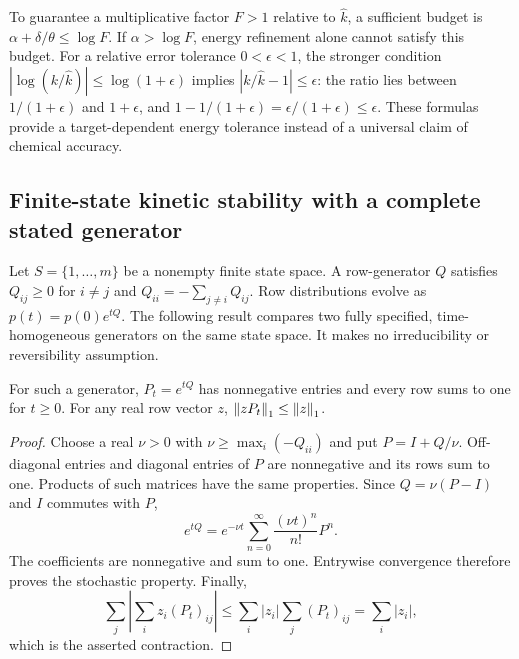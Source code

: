 To guarantee a multiplicative factor $F>1$ relative to $\widehat k$, a
sufficient budget is $\alpha+\delta/\theta\le\log F$.
If $\alpha>\log F$, energy refinement alone cannot satisfy this budget.
For a relative error tolerance $0<\epsilon<1$, the stronger condition
$|\log(k/\widehat k)|\le\log(1+\epsilon)$ implies
$|k/\widehat k-1|\le\epsilon$: the ratio lies between
$1/(1+\epsilon)$ and $1+\epsilon$, and
$1-1/(1+\epsilon)=\epsilon/(1+\epsilon)\le\epsilon$.
These formulas provide a target-dependent energy tolerance instead of a
universal claim of chemical accuracy.

\subsection{Finite-state kinetic stability with a complete stated generator}
Let $S=\{1,\ldots,m\}$ be a nonempty finite state space. A row-generator
$Q$ satisfies $Q_{ij}\ge0$ for $i\ne j$ and
$Q_{ii}=-\sum_{j\ne i}Q_{ij}$. Row distributions evolve as
$p(t)=p(0)e^{tQ}$. The following result compares two fully specified,
time-homogeneous generators on the same state space. It makes no
irreducibility or reversibility assumption.

\begin{lemma}
\label{lem:markov}
For such a generator, $P_t=e^{tQ}$ has nonnegative entries and every row
sums to one for $t\ge0$. For any real row vector $z$,
$\left\lVert zP_t\right\rVert_1\le\left\lVert z\right\rVert_1$.
\end{lemma}
\begin{proof}
Choose a real $\nu>0$ with $\nu\ge\max_i(-Q_{ii})$ and put
$P=I+Q/\nu$. Off-diagonal entries and diagonal entries of $P$ are
nonnegative and its rows sum to one. Products of such matrices have the
same properties. Since $Q=\nu(P-I)$ and $I$ commutes with $P$,
\[
 e^{tQ}=e^{-\nu t}\sum_{n=0}^\infty\frac{(\nu t)^n}{n!}P^n.
\]
The coefficients are nonnegative and sum to one. Entrywise convergence
therefore proves the stochastic property. Finally,
\[
 \sum_j\left|\sum_i z_i(P_t)_{ij}\right|
 \le\sum_i|z_i|\sum_j(P_t)_{ij}=\sum_i|z_i|,
\]
which is the asserted contraction.
\end{proof}


